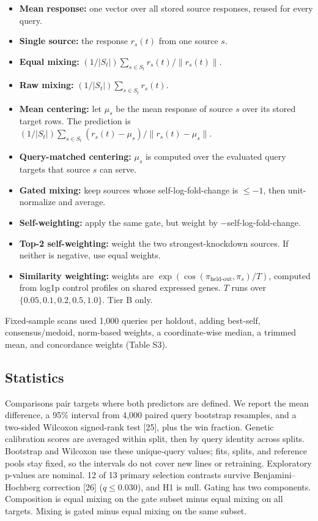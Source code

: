\documentclass[12pt]{article}
\begin{document}
\begin{itemize}
\item \textbf{Mean response:} one vector over all stored source responses, reused for every query.
\item \textbf{Single source:} the response $r_s(t)$ from one source $s$.
\item \textbf{Equal mixing:} $(1/|S_t|)\sum_{s \in S_t} r_s(t) / \lVert r_s(t) \rVert$.
\item \textbf{Raw mixing:} $(1/|S_t|)\sum_{s \in S_t} r_s(t)$.
\item \textbf{Mean centering:} let $\mu_s$ be the mean response of source $s$ over its stored target rows. The prediction is $(1/|S_t|)\sum_{s \in S_t}(r_s(t) - \mu_s)/\lVert r_s(t) - \mu_s \rVert$.
\item \textbf{Query-matched centering:} $\mu_s$ is computed over the evaluated query targets that source $s$ can serve.
\item \textbf{Gated mixing:} keep sources whose self-log-fold-change is $\le -1$, then unit-normalize and average.
\item \textbf{Self-weighting:} apply the same gate, but weight by $-$self-log-fold-change.
\item \textbf{Top-2 self-weighting:} weight the two strongest-knockdown sources. If neither is negative, use equal weights.
\item \textbf{Similarity weighting:} weights are $\exp(\cos(\pi_{\text{held-out}}, \pi_s)/T)$, computed from log1p control profiles on shared expressed genes. $T$ runs over $\{0.05, 0.1, 0.2, 0.5, 1.0\}$. Tier B only.
\end{itemize}

Fixed-sample scans used 1,000 queries per holdout, adding best-self, consensus/medoid, norm-based weights, a coordinate-wise median, a trimmed mean, and concordance weights (Table S3).

\subsection*{Statistics}

Comparisons pair targets where both predictors are defined. We report the mean difference, a 95\% interval from 4,000 paired query bootstrap resamples, and a two-sided Wilcoxon signed-rank test [25], plus the win fraction. Genetic calibration scores are averaged within split, then by query identity across splits. Bootstrap and Wilcoxon use these unique-query values; fits, splits, and reference pools stay fixed, so the intervals do not cover new lines or retraining. Exploratory p-values are nominal. 12 of 13 primary selection contrasts survive Benjamini--Hochberg correction [26] ($q \le 0.030$), and H1 is null. Gating has two components. Composition is equal mixing on the gate subset minus equal mixing on all targets. Mixing is gated minus equal mixing on the same subset.
\end{document}
